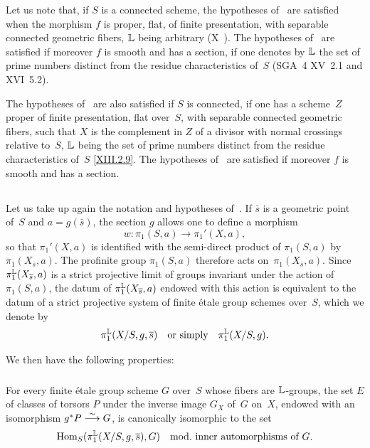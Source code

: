 \begin{examples}
\label{XIII.4.4}
Let us note that, if $S$ is a connected scheme, the hypotheses
of~ are satisfied when the morphism $f$ is proper,
flat, of finite presentation, with separable connected geometric
fibers, $\mathbb{L}$ being arbitrary
(\cf X~). The hypotheses of~ are
satisfied if moreover $f$ is smooth and has a section, if one
denotes by $\mathbb{L}$ the set of prime numbers distinct from the
residue characteristics of~$S$ (SGA~4 XV~2.1 and XVI~5.2).

The hypotheses of~ are also satisfied if $S$ is connected,
if one has a scheme~$Z$ proper of finite presentation, flat over~$S$, with
separable connected geometric fibers, such that $X$ is
the complement in $Z$ of a divisor with normal crossings
relative to~$S$, $\mathbb{L}$ being the set of prime
numbers distinct from the residue characteristics of~$S$
\eqref{XIII.2.9}. The hypotheses of~ are
satisfied if moreover $f$ is smooth and has a section.
\end{examples}

\subsection{}
\label{XIII.4.5}
Let us take up again the notation and hypotheses of~. If
$\bar{s}$ is a geometric point of~$S$ and $a=g(\bar{s})$,
the section $g$ allows one to define a morphism
$$
w\colon \pi_1(S,a)\to \pi_1'(X,a),
$$
so that $\pi_1'(X,a)$ is identified with the semi-direct product of
$\pi_1(S,a)$ by $\pi_1(X_{\bar{s}},a)$. The profinite group
$\pi_1(S,a)$ therefore acts on~$\pi_1(X_{\bar{s}}, a)$. Since
$\pi_1^{\mathbb{L}}(X_{\overline{s}},a)$ is a strict projective limit of groups
invariant under the action of~$\pi_1(S,a)$, the datum of
$\pi_1^{\mathbb{L}}(X_{\overline{s}},a)$ endowed with this action is equivalent
to the datum of a strict projective system of finite \'etale
group schemes over~$S$, which we denote by
$$
\pi_1^{\mathbb{L}}(X/S,g,\overline{s})\quad\text{or
simply}\quad\pi_1^{\mathbb{L}}(X/S,g).
$$

We then have the following properties:
\setcounter{subsubsection}{0}

\subsubsection{}
\label{XIII.4.5.1}
For every finite \'etale group scheme $G$ over~$S$ whose
fibers are $\mathbb{L}$-groups, the set $E$ of classes of torsors
$P$ under the inverse image $G_X$ of~$G$ on~$X$, endowed with an isomorphism
$g^*P\overset{\sim}{\longrightarrow} G$, is canonically isomorphic to the set
$$
\operatorname{Hom}_S(\pi_1^{\mathbb{L}}(X/S,g,\overline{s}),G) \quad\text{mod.\ inner
automorphisms of~$G$.}
$$

